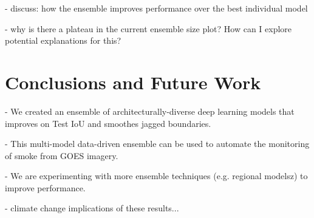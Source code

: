 \documentclass{article}
\begin{document}
- discuss: how the ensemble improves performance over the best individual model

- why is there a plateau in the current ensemble size plot? How can I explore potential explanations for this? 

\section{Conclusions and Future Work}
- We created an ensemble of architecturally-diverse deep learning models that improves on Test IoU and smoothes jagged boundaries.

- This multi-model data-driven ensemble can be used to automate the monitoring of smoke from GOES imagery.

- We are experimenting with more ensemble techniques (e.g. regional modelsz) to improve performance.

- climate change implications of these results...




\end{document}
